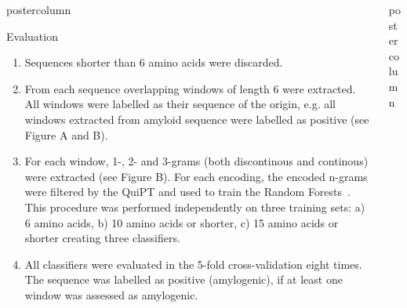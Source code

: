 \documentclass[final]{beamer}\usepackage[]{graphicx}\usepackage[]{color}
\newlength{\columnheight}
\begin{document}
\begin{frame}
\begin{columns}
\begin{column}{.485\textwidth}
\begin{beamercolorbox}[center,wd=\textwidth]{postercolumn}
\begin{minipage}[T]{.95\textwidth}
{\begin{block}{Evaluation}
\begin{enumerate}[1.]
\item Sequences shorter than 6 amino acids were discarded.
\item From each sequence overlapping windows of length 6 were extracted. All windows were labelled as their sequence of the origin, e.g. all windows extracted from amyloid sequence were labelled as positive (see Figure A and B).
\item For each window, 1-, 2- and 3-grams (both discontinous and continous) were extracted (see Figure B). For each encoding, the encoded n-grams were filtered by the QuiPT and used to train the Random Forests~\citep{liaw_classification_2002}. This procedure was performed independently on three training sets: a) 6 amino acids, b) 10 amino acids or shorter, c) 15 amino acids or shorter creating three classifiers.
\item All classifiers were evaluated in the 5-fold cross-validation eight times. The sequence was labelled as positive (amylogenic), if at least one window was assessed as amylogenic.
\end{enumerate}

\end{block}
\vfill



}
\end{minipage}
\end{beamercolorbox}
\end{column}



\begin{column}{.51\textwidth}
\begin{beamercolorbox}[center,wd=\textwidth]{postercolumn}
\begin{minipage}[T]{.95\textwidth}  
\parbox[t][\columnheight]{\textwidth}
{







}
\end{minipage}
\end{beamercolorbox}
\end{column}
\end{columns}
\end{frame}
\end{document}

